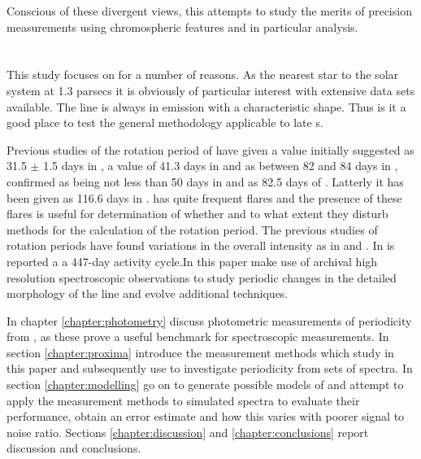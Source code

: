 Conscious of these divergent views, this {\paperorthesis} attempts to study the merits of precision measurements using
chromospheric features and in particular {\ha} analysis.

\section{\prox}
\protect\label{section:intoprox}


This study focuses on {\prox} for a number of reasons. As the nearest star to the solar system at 1.3 parsecs it is
obviously of particular interest with extensive data sets available. The {\ha} line is always in emission with a
characteristic shape. Thus is it a good place to test the general methodology applicable to late \rdwarf s.

Previous studies of the rotation period of {\prox} have given a value initially suggested as 31.5 $\pm$ 1.5 days in
\citet{guinan96}, a value of 41.3 days in \citet{benedict93} and as between 82 and 84 days in
\citealt{benedict92,benedict98}, confirmed as being not less than 50 days in \citet{kurster99} and as 82.5 days of
\citet{kiraga07}. Latterly it has been given as 116.6 days in \citet[Table 3]{suarezmascareno15}.  {\prox} has quite
frequent flares and the presence of these flares is useful for determination of whether and to what extent they disturb
methods for the calculation of the rotation period. The previous studies of rotation periods have found variations in
the overall intensity as in \citet{benedict98} and \citet{kiraga07}. In \citet{cincunegui07} is reported a a 447-day
activity cycle.In this paper {\Firstp} make use of archival high resolution spectroscopic observations to study periodic
changes in the detailed morphology of the {\ha} line and evolve additional techniques.

In chapter \ref{chapter:photometry} {\Firstp} discuss photometric measurements of periodicity from \prox, as these prove a
useful benchmark for spectroscopic measurements. In section \ref{chapter:proxima} {\Firstp} introduce the measurement
methods which {\Firstp} study in this paper and subsequently use to investigate periodicity from sets of spectra. In
section \ref{chapter:modelling} {\Firstp} go on to generate possible models of {\prox} and attempt to apply the
measurement methods to simulated spectra to evaluate their performance, obtain an error estimate and how this varies
with poorer signal to noise ratio. Sections \ref{chapter:discussion} and \ref{chapter:conclusions} report {\Firstposs}
discussion and conclusions.

